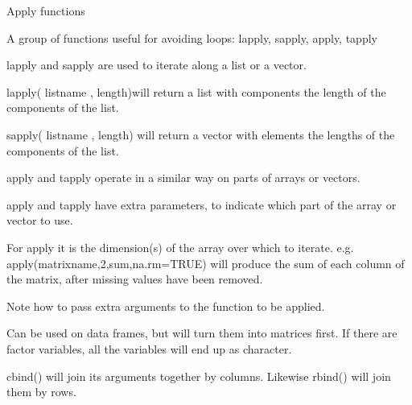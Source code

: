 Apply functions

A group of functions useful for avoiding loops:
lapply, sapply, apply, tapply

lapply and sapply are used to iterate along a list or a vector.

lapply( listname , length)will return a list with components the length of the components of the list.

sapply( listname , length) will return a vector with elements the lengths of the components of the list.

apply and tapply operate in a similar way on parts of arrays or
vectors.

apply and tapply have extra parameters, to indicate which part
of the array or vector to use. 

For apply it is the dimension(s) of the array over which to iterate. e.g.
apply(matrixname,2,sum,na.rm=TRUE)
will produce the sum of each column of the matrix, after missing
values have been removed.

Note how to pass extra arguments to the function to be applied.

Can be used on data frames, but will turn them into matrices first.
If there are factor variables, all the variables will end up as
character. 

cbind() will join its arguments together by columns. Likewise rbind() will join them by rows.


